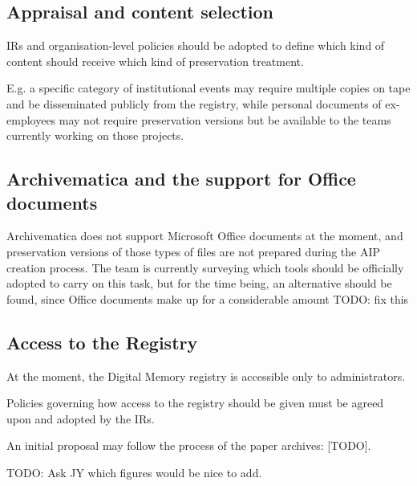 \documentclass[11pt]{IEEEtran}
\begin{document}
\subsection{Appraisal and content selection}

IRs and organisation-level policies should be adopted to define which kind of content should receive which kind of preservation treatment.

E.g. a specific category of institutional events may require multiple copies on tape and be disseminated publicly from the registry, while personal documents of ex-employees may not require preservation versions but be available to the teams currently working on those projects.


\subsection{Archivematica and the support for Office documents}
Archivematica does not support Microsoft Office documents at the moment, and preservation versions of those types of files are not prepared during the AIP creation process.
The team is currently surveying which tools should be officially adopted to carry on this task, but for the time being, an alternative should be found, since Office documents make up for a considerable amount TODO: fix this

\subsection{Access to the Registry}
At the moment, the Digital Memory registry is accessible only to administrators.

Policies governing how access to the registry should be given must be agreed upon and adopted by the IRs.

An initial proposal may follow the process of the paper archives: [TODO].

TODO: Ask JY which figures would be nice to add.



\end{document}
